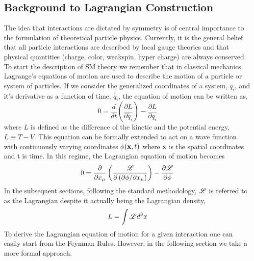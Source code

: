 \subsection{Background to Lagrangian Construction}%
The idea that interactions are dictated by symmetry is of central
importance to the formulation of theoretical particle physics. 
Currently, it is the general belief that all particle interactions are
described by local gauge theories and that 
physical quantities (charge, color, weakspin, hyper charge) are 
always conserved.
To start the description of SM theory we remember that in classical 
mechanics Lagrange's equations of motion are used to
describe the motion of a particle or system of particles. %
If we consider the generalized coordinates of a system, $q_{i}$,
and it's derivative as a function of time, $\dot{q_{i}}$, the equation
of motion can be written as,
\begin{equation}
0=\frac{d}{dt}\left(\frac{\partial L}{\partial\dot{q_{i}}}\right) - \frac{\partial L}{\partial q_{i}}
\end{equation}
where $L$ is defined as the difference of the kinetic and the potential energy, $L\equiv T-V$.
This equation can be formally extended to act on a wave function with %
continuously varying coordinates $\phi({\bf x},t)$
where {\bf x} is the spatial coordinates and t is time.
In this regime, the Lagrangian equation of motion becomes
\begin{equation}
0=\frac{\partial}{\partial x_{\mu}}\left( \frac{\mathscr{L}}{\partial\left(\partial\phi/\partial x_{\mu}\right)}\right)-\frac{\partial\mathscr{L}}{\partial\phi}
\end{equation}
In the subsequent sections, following the standard methodology, $\mathscr{L}$ is referred to as the Lagrangian
despite it actually being the Lagrangian density,
\begin{equation}
L=\int{\mathscr{L}d^{3}x}
\end{equation}
To derive the Lagrangian equation of motion for a given interaction
one can easily start from the Feynman Rules.
However, in the following section we take a more formal approach.

